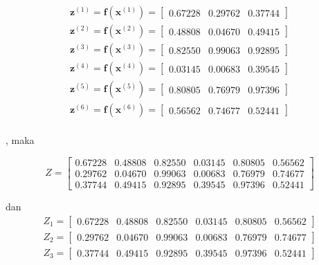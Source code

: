 \begin{equation}
  \begin{align}
    \mathbf{z}^{(1)}=\mathbf{f}(\mathbf{x}^{(1)})=\begin{bmatrix}0.67228 & 0.29762 & 0.37744\end{bmatrix}\\
    \mathbf{z}^{(2)}=\mathbf{f}(\mathbf{x}^{(2)})=\begin{bmatrix}0.48808 & 0.04670 & 0.49415\end{bmatrix}\\
    \mathbf{z}^{(3)}=\mathbf{f}(\mathbf{x}^{(3)})=\begin{bmatrix}0.82550 & 0.99063 & 0.92895\end{bmatrix}\\
    \mathbf{z}^{(4)}=\mathbf{f}(\mathbf{x}^{(4)})=\begin{bmatrix}0.03145 & 0.00683 & 0.39545\end{bmatrix}\\
    \mathbf{z}^{(5)}=\mathbf{f}(\mathbf{x}^{(5)})=\begin{bmatrix}0.80805 & 0.76979 & 0.97396\end{bmatrix}\\
    \mathbf{z}^{(6)}=\mathbf{f}(\mathbf{x}^{(6)})=\begin{bmatrix}0.56562 & 0.74677 & 0.52441\end{bmatrix}\\
  \end{align}
\end{equation}

, maka 

\begin{equation}
  Z = 
  \begin{bmatrix} 
    0.67228 & 0.48808 & 0.82550 & 0.03145 & 0.80805 & 0.56562 \\
    0.29762 & 0.04670 & 0.99063 & 0.00683 & 0.76979 & 0.74677 \\
    0.37744 & 0.49415 & 0.92895 & 0.39545 & 0.97396 & 0.52441
  \end{bmatrix}
\end{equation}

dan
\begin{equation}
  \begin{align}
  Z_1 =
  \begin{bmatrix}
    0.67228 & 0.48808 & 0.82550 & 0.03145 & 0.80805 & 0.56562
  \end{bmatrix} \\
  Z_2 =
  \begin{bmatrix}
    0.29762 & 0.04670 & 0.99063 & 0.00683 & 0.76979 & 0.74677
  \end{bmatrix} \\
  Z_3 =
  \begin{bmatrix}
    0.37744 & 0.49415 & 0.92895 & 0.39545 & 0.97396 & 0.52441
  \end{bmatrix} \\
  \end{align}
\end{equation}


